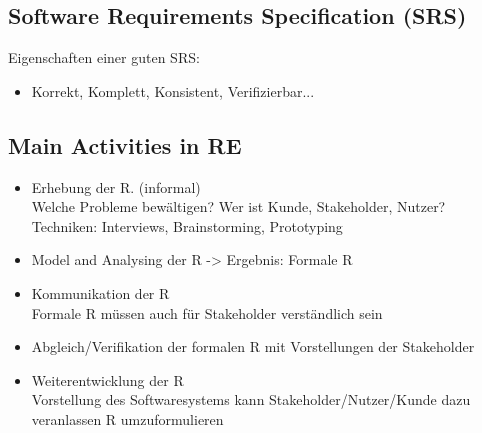 \subsection{Software Requirements Specification (SRS)}
Eigenschaften einer guten SRS:
\begin{itemize}
	\item Korrekt, Komplett, Konsistent, Verifizierbar...
\end{itemize}

\subsection{Main Activities in RE}
\begin{itemize}
	\item Erhebung der R. (informal)\\
	Welche Probleme bewältigen? Wer ist Kunde, Stakeholder, Nutzer? Techniken: Interviews, Brainstorming, Prototyping
	\item Model and Analysing der R -> Ergebnis: Formale R
	\item Kommunikation der R\\
	Formale R müssen auch für Stakeholder verständlich sein
	\item Abgleich/Verifikation der formalen R mit Vorstellungen der Stakeholder
	\item Weiterentwicklung der R \\
	Vorstellung des Softwaresystems kann Stakeholder/Nutzer/Kunde dazu veranlassen R umzuformulieren
\end{itemize}